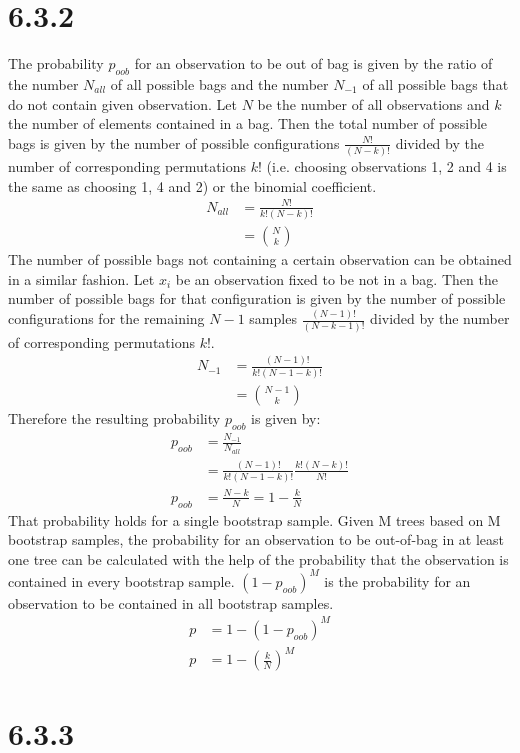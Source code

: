 \documentclass[a4paper,11pt]{article}
\theoremstyle{definition}
\theoremstyle{plain}
\theoremstyle{remark}
\begin{document}
\section*{6.3.2}
The probability $p_{oob}$ for an observation to be out of bag is given by the ratio of the number $N_{all}$ of all possible bags and the number $N_{-1}$ of all possible bags that do not contain given observation. Let $N$ be the number of all observations and $k$ the number of elements contained in a bag. Then the total number of possible bags is given by the number of possible configurations $\frac{N!}{(N-k)!}$ divided by the number of corresponding permutations $k!$ (i.e. choosing observations 1, 2 and 4 is the same as choosing 1, 4 and 2) or the binomial coefficient.
\begin{align}
N_{all} &= \frac{N!}{k!(N-k)!} \\
&= \binom{N}{k}
\end{align}
The number of possible bags not containing a certain observation can be obtained in a similar fashion. Let $x_i$ be an observation fixed to be not in a bag. Then the number of possible bags for that configuration is given by the number of possible configurations for the remaining $N-1$ samples $\frac{(N-1)!}{(N-k-1)!}$ divided by the number of corresponding permutations $k!$.
\begin{align}
N_{-1} &= \frac{(N-1)!}{k!(N-1-k)!} \\
&= \binom{N-1}{k}
\end{align}
Therefore the resulting probability $p_{oob}$ is given by:
\begin{align}
p_{oob} &= \frac{N_{-1}}{N_{all}} \\
&=\frac{(N-1)!}{k!(N-1-k)!}\frac{k!(N-k)!}{N!} \\
p_{oob} &= \frac{N-k}{N} = 1 - \frac{k}{N}
\end{align}
That probability holds for a single bootstrap sample. Given M trees based on M bootstrap samples, the probability for an observation to be out-of-bag in at least one tree can be calculated with the help of the probability that the observation is contained in every bootstrap sample. $(1-p_{oob})^M$ is the probability for an observation to be contained in all bootstrap samples.
\begin{align}
p &= 1-(1-p_{oob})^M \\
p &=1-(\frac{k}{N})^M \label{eq:oob}
\end{align}

\clearpage
\section*{6.3.3}
\end{document}
